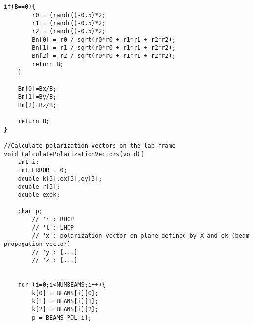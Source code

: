 \begin{lstlisting}[style=CStyle]
    if(B==0){
        r0 = (randr()-0.5)*2;
        r1 = (randr()-0.5)*2;
        r2 = (randr()-0.5)*2;
        Bn[0] = r0 / sqrt(r0*r0 + r1*r1 + r2*r2);
        Bn[1] = r1 / sqrt(r0*r0 + r1*r1 + r2*r2);
        Bn[2] = r2 / sqrt(r0*r0 + r1*r1 + r2*r2);
        return B;
    }

    Bn[0]=Bx/B;
    Bn[1]=By/B;
    Bn[2]=Bz/B;

    return B;
}

//Calculate polarization vectors on the lab frame
void CalculatePolarizationVectors(void){
    int i;
    int ERROR = 0;
    double k[3],ex[3],ey[3];
    double r[3];
    double exek;

    char p;
        // 'r': RHCP
        // 'l': LHCP
        // 'x': polarization vector on plane defined by X and ek (beam propagation vector)
        // 'y': [...]
        // 'z': [...]


    for (i=0;i<NUMBEAMS;i++){
        k[0] = BEAMS[i][0];
        k[1] = BEAMS[i][1];
        k[2] = BEAMS[i][2];
        p = BEAMS_POL[i];


\end{lstlisting}
